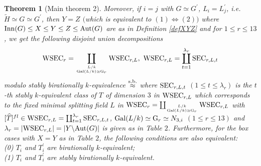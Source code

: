\documentclass{amsart}
\theoremstyle{plain}
\newtheorem{theorem}{Theorem}[section]
\theoremstyle{definition}
\theoremstyle{remark}
\newcommand{\bZ}{\mathbbm{Z}}\newcommand{\bQ}{\mathbbm{Q}}
\newcommand{\GL}{{\rm GL}}\newcommand{\SL}{{\rm SL}}
\begin{document}
\begin{theorem}[Main theorem 2]
Moreover, if $i=j$ with $G\simeq G^\prime$, $L_i=L_j^\prime$, 
i.e. $\widetilde{H}\simeq G\simeq G^\prime$, 
then $Y=Z$ $($which is equivalent to $(1)\Leftrightarrow (2)$$)$ 
where ${\rm Inn}(G)\leq X\leq Y\leq Z\leq {\rm Aut}(G)$ 
are as in Definition \ref{defXYZ} 
%
%
and for $1\leq r\leq 13$, we get the following disjoint union decompositions 
\begin{align*}
{\rm WSEC}_r=\coprod_{L/k\atop {\rm Gal}(L/k)\simeq {\rm G}_r}
{\rm WSEC}_{r,L},\ 
{\rm WSEC}_{r,L}=
\coprod_{t=1}^{\lambda_{r}} {\rm SEC}_{r,L,t}
\end{align*}
modulo stably birationally $k$-equivalence $\stackrel{\rm s.b.}{\approx}$ 
where 
${\rm SEC}_{r,L,t}$ $(1\leq t\leq \lambda_{r})$ is the $t$-th 
stably $k$-equivalent class of $T$ of dimension $3$ in 
${\rm WSEC}_{r,L}$ which corresponds to the fixed minimal splitting field $L$ 
in 
${\rm WSEC}_r=\coprod_{L/k\atop {\rm Gal}(L/k)\simeq {\rm G}_r} {\rm WSEC}_{r,L}$ 
with 
$[\widehat{T}]^{fl}\in {\rm WSEC}_{r,L}
=\coprod_{t=1}^{\lambda_r} {\rm SEC}_{r,L,t}$, 
${\rm Gal}(L/k)\simeq {\rm G}_r\simeq N_{3,i}$ 
$(1\leq r\leq 13)$ and 
$\lambda_r=|{\rm WSEC}_{r,L}|=|Y\backslash {\rm Aut}(G)|$
is given as in Table $2$. 
%
Furthermore, 
for the box cases  with $X=Y$ as in Table $2$,
the following conditions are also equivalent:\\
{\rm (0)} $T_i$ and $T_i^\prime$ are birationally $k$-equivalent;\\
{\rm (1)} $T_i$ and $T_i^\prime$ are stably birationally $k$-equivalent. 


\end{theorem}
\end{document}
